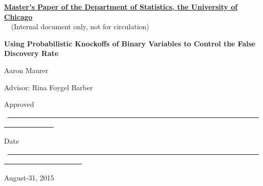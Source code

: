 \documentclass[11pt]{article}
\theoremstyle{definition}
\begin{document}
\noindent
\thispagestyle{empty}
\underline{\bf Master's Paper of the Department of Statistics, the University of Chicago} 
    \\~~(Internal document only, not for circulation) 

\vspace{1.8in}
\begin{center}
    {\bf\LARGE Using Probabilistic Knockoffs of Binary Variables to Control the False Discovery Rate}

    \vspace{1.4in}
    {\Large Aaron Maurer}

    \vspace{1.3in}
    {\Large Advisor: Rina Foygel Barber }

\end{center}

\vspace{.6in}
{\Large Approved} ~\underline{~~~~~~~~~~~~~~~~~~~~~~~~~~~~~~~~~~~~~~~~~~~~~~~~~~~~~~~~~~~~~~~~~~~~~~~~~~~~~~~~~~~~~}

\vspace{.2in}
{\Large Date} ~\underline{~~~~~~~~~~~~~~~~~~~~~~~~~~~~~~~~~~~~~~~~~~~~~~~~~~~~~~~~~~~~~~~~~~~~~~~~~~~~~~~~~~~~~~~~~~~~~}

\vfill
\begin{center}{\large August-31, 2015}\end{center}

\newpage
\pagestyle{plain}
\setcounter{page}{1}

\begin{abstract}

    \vspace{7mm}\noindent  Variable selection for regression is a key problem in applied statistics. The knockoff filter method provides one method of variable selection for linear regression. It relies on generating 'knockoff' features, which replicate the correlation structure of the original variable; when the full path of LASSO regression is fit, the point at which a a null variable and its knockoff have nonzero coefficients will be exchangeable. However, for other GLMs, the method breaks down. I will provide an alternative method of randomly generating knockoffs for binary variables which will will satisfy the original correlation condition in expectation and offer improved performance for other GLMs. \end{abstract}

\newpage
\vspace{1.5in}
\tableofcontents
\end{document}
